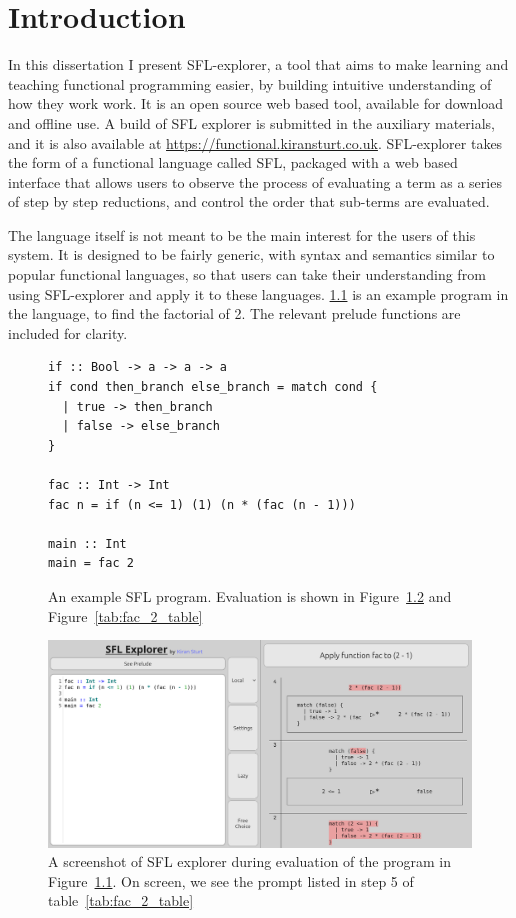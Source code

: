 \chapter{Introduction}
\label{chap:context}
In this dissertation I present SFL-explorer, a tool that aims to make learning and teaching functional programming easier, by building intuitive understanding of how they work work. It is an open source web based tool, available for download and offline use. A build of SFL explorer is submitted in the auxiliary materials, and it is also available at \href{https://functional.kiransturt.co.uk}{https://functional.kiransturt.co.uk}. 
SFL-explorer takes the form of a functional language called \ac{SFL}, packaged with a web based interface that allows users to observe the process of evaluating a term as a series of step by step reductions, and control the order that sub-terms are evaluated. 


The language itself is not meant to be the main interest for the users of this system. It is designed to be fairly generic, with syntax and semantics similar to popular functional languages, so that users can take their understanding from using SFL-explorer and apply it to these languages. \ref{tab:fac_2_table_input} is an example program in the language, to find the factorial of 2. The relevant prelude functions are included for clarity.

\begin{figure}[h]
\begin{lstlisting}[language=SFL]
if :: Bool -> a -> a -> a
if cond then_branch else_branch = match cond {
  | true -> then_branch
  | false -> else_branch
}

fac :: Int -> Int
fac n = if (n <= 1) (1) (n * (fac (n - 1)))

main :: Int
main = fac 2
\end{lstlisting}
\caption{An example SFL program. Evaluation is shown in Figure~\ref{intro_fac_2_screenshot} and Figure~\ref{tab:fac_2_table}}
\label{tab:fac_2_table_input}
\end{figure}


\begin{figure}[t]
  \centering
  \includegraphics[width=0.9\linewidth]{images/intro_fac_2.png}
  \caption{A screenshot of SFL explorer during evaluation of the program in Figure~\ref{tab:fac_2_table_input}. On screen, we see the prompt listed in step 5 of table~\ref{tab:fac_2_table}}
  \label{intro_fac_2_screenshot}
\end{figure}

